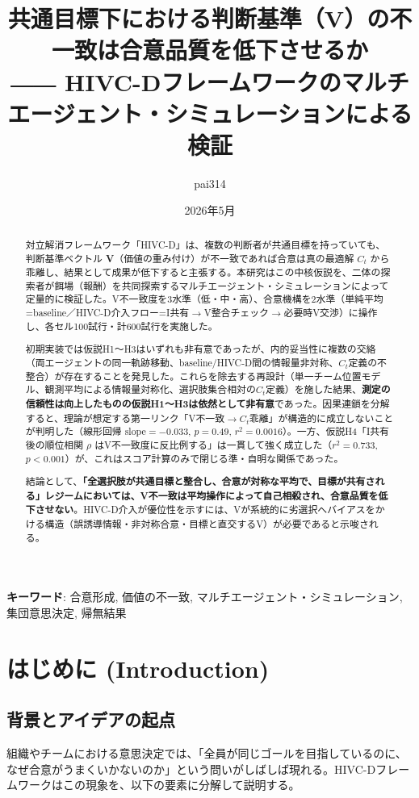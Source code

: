 \documentclass[11pt]{ltjsarticle}
\title{共通目標下における判断基準（V）の不一致は合意品質を低下させるか\\[2pt]
\large ―― HIVC-Dフレームワークのマルチエージェント・シミュレーションによる検証}
\author{pai314}
\date{2026年5月}
\newcommand{\Ct}{\ensuremath{C_t}}
\begin{document}
\maketitle

\begin{abstract}
対立解消フレームワーク「HIVC-D」は、複数の判断者が共通目標を持っていても、判断基準ベクトル \textbf{V}（価値の重み付け）が不一致であれば合意は真の最適解 \Ct{} から乖離し、結果として成果が低下すると主張する。本研究はこの中核仮説を、二体の探索者が餌場（報酬）を共同探索するマルチエージェント・シミュレーションによって定量的に検証した。V不一致度を3水準（低・中・高）、合意機構を2水準（単純平均=baseline／HIVC-D介入フロー=I共有$\to$V整合チェック$\to$必要時V交渉）に操作し、各セル100試行・計600試行を実施した。

初期実装では仮説H1〜H3はいずれも非有意であったが、内的妥当性に複数の交絡（両エージェントの同一軌跡移動、baseline/HIVC-D間の情報量非対称、\Ct{}定義の不整合）が存在することを発見した。これらを除去する再設計（単一チーム位置モデル、観測平均による情報量対称化、選択肢集合相対の\Ct{}定義）を施した結果、\textbf{測定の信頼性は向上したものの仮説H1〜H3は依然として非有意}であった。因果連鎖を分解すると、理論が想定する第一リンク「V不一致$\to$\Ct{}乖離」が構造的に成立しないことが判明した（線形回帰 slope$=-0.033$, $p=0.49$, $r^2=0.0016$）。一方、仮説H4「I共有後の順位相関 $\rho$ はV不一致度に反比例する」は一貫して強く成立した（$r^2=0.733$, $p<0.001$）が、これはスコア計算のみで閉じる準・自明な関係であった。

結論として、\textbf{「全選択肢が共通目標と整合し、合意が対称な平均で、目標が共有される」レジームにおいては、V不一致は平均操作によって自己相殺され、合意品質を低下させない}。HIVC-D介入が優位性を示すには、Vが系統的に劣選択へバイアスをかける構造（誤誘導情報・非対称合意・目標と直交するV）が必要であると示唆される。
\end{abstract}

\noindent\textbf{キーワード}: 合意形成, 価値の不一致, マルチエージェント・シミュレーション, 集団意思決定, 帰無結果

\section{はじめに (Introduction)}

\subsection{背景とアイデアの起点}

組織やチームにおける意思決定では、「全員が同じゴールを目指しているのに、なぜ合意がうまくいかないのか」という問いがしばしば現れる。HIVC-Dフレームワークはこの現象を、以下の要素に分解して説明する。
\end{document}
